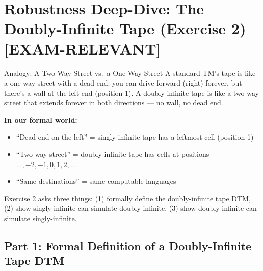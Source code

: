 \documentclass[11pt,a4paper]{article}
\newcommand{\kemark}{\textcolor{red!70!black}{\textbf{[EXAM-RELEVANT]}}}
\begin{document}
\newpage
\section{Robustness Deep-Dive: The Doubly-Infinite Tape (Exercise 2) \kemark}

\begin{notebox}{Analogy: A Two-Way Street vs.\ a One-Way Street}
A standard TM's tape is like a one-way street with a dead end: you can drive forward (right) forever, but there's a wall at the left end (position 1). A doubly-infinite tape is like a two-way street that extends forever in both directions --- no wall, no dead end.

\textbf{In our formal world:}
\begin{itemize}[nosep]
\item ``Dead end on the left'' = singly-infinite tape has a leftmost cell (position 1)
\item ``Two-way street'' = doubly-infinite tape has cells at positions $\ldots, -2, -1, 0, 1, 2, \ldots$
\item ``Same destinations'' = same computable languages
\end{itemize}

Exercise 2 asks three things: (1) formally define the doubly-infinite tape DTM, (2) show singly-infinite can simulate doubly-infinite, (3) show doubly-infinite can simulate singly-infinite.
\end{notebox}

\subsection{Part 1: Formal Definition of a Doubly-Infinite Tape DTM}
\end{document}

